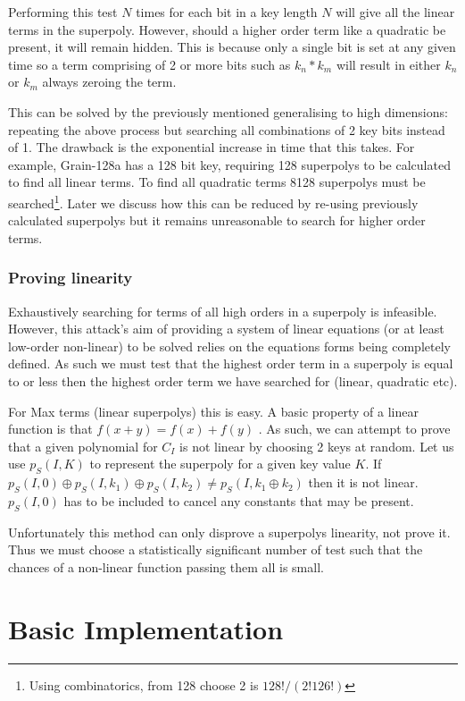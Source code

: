 \documentclass{report}
\let\Oldsection\section
\renewcommand{\section}{\FloatBarrier\Oldsection}
\let\Oldsubsubsection\subsubsection
\renewcommand{\subsubsection}{\FloatBarrier\Oldsubsubsection}
\begin{document}
Performing this test $N$ times for each bit in a key length $N$ will give all the linear terms in the superpoly. However, should a higher order term like a quadratic be present, it will remain hidden. This is because only a single bit is set at any given time so a term comprising of 2 or more bits such as $k_n*k_m$ will result in either $k_n$ or $k_m$ always zeroing the term.

This can be solved by the previously mentioned generalising to high dimensions: repeating the above process but searching all combinations of 2 key bits instead of 1. The drawback is the exponential increase in time that this takes. For example, Grain-128a has a 128 bit key, requiring 128 superpolys to be calculated to find all linear terms. To find all quadratic terms 8128 superpolys must be searched\footnote{Using combinatorics, from 128 choose 2 is $128!/(2!126!)$}. Later we discuss how this can be reduced by re-using previously calculated superpolys but it remains unreasonable to search for higher order terms.
\subsubsection{Proving linearity}
Exhaustively searching for terms of all high orders in a superpoly is infeasible. However, this attack's aim of providing a system of linear equations (or at least low-order non-linear) to be solved relies on the equations forms being completely defined. As such we must test that the highest order term in a superpoly is equal to or less then the highest order term we have searched for (linear, quadratic etc).

For Max terms (linear superpolys) this is easy. A basic property of a linear function is that $f(x+y)=f(x)+f(y)$ \cite{linearproperties}.
As such, we can attempt to prove that a given polynomial for $C_I$ is not linear by choosing 2 keys at random. Let us use $p_S(I,K)$ to represent the superpoly for a given key value $K$. If $p_S(I,0) \oplus p_S(I, k_1)\oplus p_S(I, k_2) \neq p_S(I, k_1 \oplus k_2)$ then it is not linear. $p_S(I, 0)$ has to be included to cancel any constants that may be present.

Unfortunately this method can only disprove a superpolys linearity, not prove it. Thus we must choose a statistically significant number of test such that the chances of a non-linear function passing them all is small.

\section{Basic Implementation}
\end{document}
